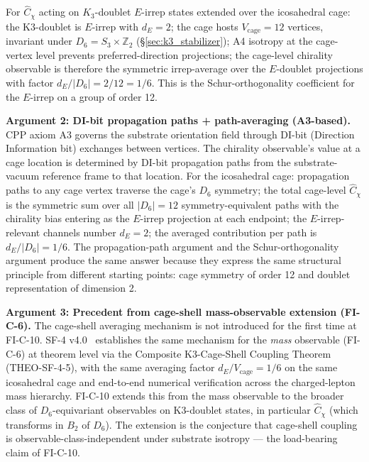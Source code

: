 \documentclass[11pt,letterpaper]{article}
\newcommand{\Kthree}{\ensuremath{K_3}}
\newcommand{\Cchi}{\hat{C}_\chi}
\newcommand{\Dsix}{D_6}
\newcommand{\Sthree}{S_3}
\begin{document}
For $\Cchi$ acting on $\Kthree$-doublet $E$-irrep states extended over the icosahedral cage: the K3-doublet is $E$-irrep with $d_E = 2$; the cage hosts $V_\text{cage} = 12$ vertices, invariant under $\Dsix = \Sthree \times \mathbb{Z}_2$ (\S\ref{sec:k3_stabilizer}); A4 isotropy at the cage-vertex level prevents preferred-direction projections; the cage-level chirality observable is therefore the symmetric irrep-average over the $E$-doublet projections with factor $d_E/|\Dsix| = 2/12 = 1/6$. This is the Schur-orthogonality coefficient for the $E$-irrep on a group of order 12.

\textbf{Argument 2: DI-bit propagation paths + path-averaging (A3-based).}
CPP axiom A3 governs the substrate orientation field through DI-bit (Direction Information bit) exchanges between vertices. The chirality observable's value at a cage location is determined by DI-bit propagation paths from the substrate-vacuum reference frame to that location. For the icosahedral cage: propagation paths to any cage vertex traverse the cage's $\Dsix$ symmetry; the total cage-level $\Cchi$ is the symmetric sum over all $|\Dsix| = 12$ symmetry-equivalent paths with the chirality bias entering as the $E$-irrep projection at each endpoint; the $E$-irrep-relevant channels number $d_E = 2$; the averaged contribution per path is $d_E/|\Dsix| = 1/6$. The propagation-path argument and the Schur-orthogonality argument produce the same answer because they express the same structural principle from different starting points: cage symmetry of order 12 and doublet representation of dimension 2.

\textbf{Argument 3: Precedent from cage-shell mass-observable extension (FI-C-6).}
The cage-shell averaging mechanism is not introduced for the first time at FI-C-10. SF-4 v4.0~\cite{abshier_sf4} establishes the same mechanism for the \emph{mass} observable (FI-C-6) at theorem level via the Composite K3-Cage-Shell Coupling Theorem (THEO-SF-4-5), with the same averaging factor $d_E/V_\text{cage} = 1/6$ on the same icosahedral cage and end-to-end numerical verification across the charged-lepton mass hierarchy. FI-C-10 extends this from the mass observable to the broader class of $\Dsix$-equivariant observables on K3-doublet states, in particular $\Cchi$ (which transforms in $B_2$ of $\Dsix$). The extension is the conjecture that cage-shell coupling is observable-class-independent under substrate isotropy --- the load-bearing claim of FI-C-10.
\end{document}
